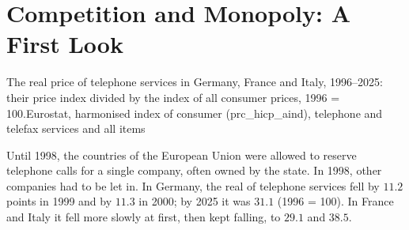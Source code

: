 \chapter{Competition and Monopoly: A First Look}\label{ch:g8:competition-and-monopoly-first-look}

\begin{openingchart}{The real price of telephone services in Germany, France and Italy, 1996--2025:
their price index divided by the index of all consumer prices, 1996 = 100.}{Eurostat, harmonised
index of consumer  (prc\_hicp\_aind), telephone and telefax services and all items}
\end{openingchart}

Until 1998, the countries of the European Union were allowed to reserve telephone calls for a single
company, often owned by the state. In 1998, other companies had to be let in. In Germany, the real 
of telephone services fell by $11.2$ points in 1999 and by $11.3$ in 2000; by 2025 it was $31.1$
(1996 = 100). In France and Italy it fell more slowly at first, then kept falling, to $29.1$ and
$38.5$.

